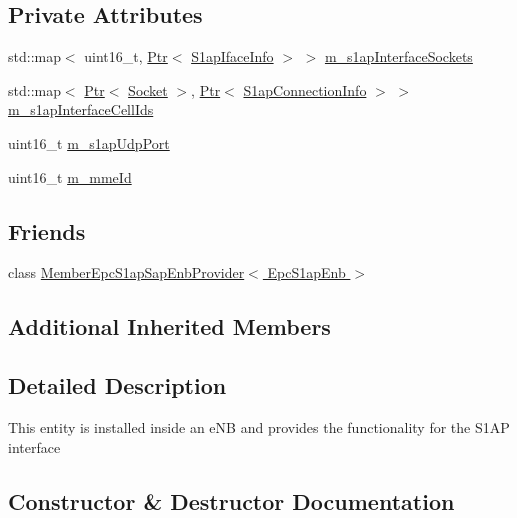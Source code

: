 \subsection*{Private Attributes}
\begin{DoxyCompactItemize}
\item 
std\+::map$<$ uint16\+\_\+t, \hyperlink{classns3_1_1Ptr}{Ptr}$<$ \hyperlink{classns3_1_1S1apIfaceInfo}{S1ap\+Iface\+Info} $>$ $>$ \hyperlink{classns3_1_1EpcS1apEnb_ad91b3139b21bd084edf401249d4e4233}{m\+\_\+s1ap\+Interface\+Sockets}
\item 
std\+::map$<$ \hyperlink{classns3_1_1Ptr}{Ptr}$<$ \hyperlink{classns3_1_1Socket}{Socket} $>$, \hyperlink{classns3_1_1Ptr}{Ptr}$<$ \hyperlink{classns3_1_1S1apConnectionInfo}{S1ap\+Connection\+Info} $>$ $>$ \hyperlink{classns3_1_1EpcS1apEnb_aea3453f0d052d6ff2874b482f26c1552}{m\+\_\+s1ap\+Interface\+Cell\+Ids}
\item 
uint16\+\_\+t \hyperlink{classns3_1_1EpcS1apEnb_ae06c681ae6a91dc4729408d0a7b4dd39}{m\+\_\+s1ap\+Udp\+Port}
\item 
uint16\+\_\+t \hyperlink{classns3_1_1EpcS1apEnb_a44a703502c1439b86664b12751b15d69}{m\+\_\+mme\+Id}
\end{DoxyCompactItemize}
\subsection*{Friends}
\begin{DoxyCompactItemize}
\item 
class \hyperlink{classns3_1_1EpcS1apEnb_aa982c937328ff55cbf78441c54e09db1}{Member\+Epc\+S1ap\+Sap\+Enb\+Provider$<$ Epc\+S1ap\+Enb $>$}
\end{DoxyCompactItemize}
\subsection*{Additional Inherited Members}


\subsection{Detailed Description}
This entity is installed inside an e\+NB and provides the functionality for the S1\+AP interface 

\subsection{Constructor \& Destructor Documentation}
